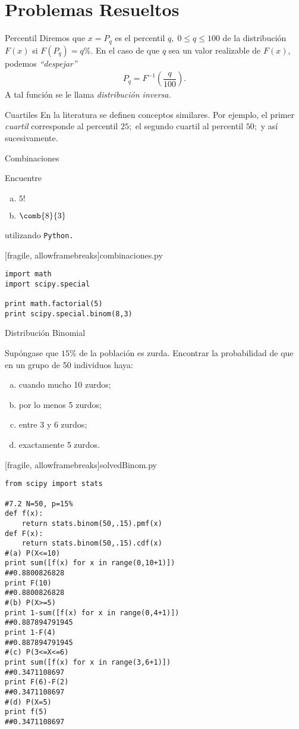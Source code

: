 \section{Problemas Resueltos}
{Percentil}
 Diremos que $x=P_{q}$ es el percentil $q, \; 0\leq q \leq 100$ de la distribución $F(x)$ si $F(P_{q})=q\%.$  En el caso de que $q$ sea un valor realizable de $F(x),$ podemos \emph{``despejar''}
 \begin{align}
  P_{q}=F^{-1}\left( \dfrac{q}{100} \right).
 \end{align}
 A tal función se le llama \emph{distribución inversa.}


{Cuartiles}
 En la literatura se definen conceptos similares. Por ejemplo, el primer \emph{cuartil} corresponde al percentil $25;$ el segundo cuartil al percentil $50;$ y así sucesivamente.

{Combinaciones}
 \begin{exmp}
  \label{sol:7.1}
  Encuentre
  \begin{enumerate}[(a)]
   \item $5!$
   \item $\comb{8}{3}$
  \end{enumerate}
  utilizando \texttt{Python.}
 \end{exmp}


[fragile, allowframebreaks]{combinaciones.py}
 \begin{verbatim}
import math
import scipy.special

print math.factorial(5)
print scipy.special.binom(8,3)
 \end{verbatim}




{Distribución Binomial}
 \begin{exmp}
  \label{sol:7.2}
  Supóngase que $15\%$ de la población es zurda. Encontrar la probabilidad de que en un grupo de 50 individuos haya:
  \begin{enumerate}[(a)]
   \item cuando mucho 10 zurdos; 
   \item por lo menos 5 zurdos; 
   \item entre 3 y 6 zurdos; 
   \item exactamente 5 zurdos.
  \end{enumerate}

 \end{exmp}


[fragile, allowframebreaks]{solvedBinom.py}
 \begin{verbatim}
from scipy import stats

#7.2 N=50, p=15%
def f(x):
    return stats.binom(50,.15).pmf(x)
def F(x):
    return stats.binom(50,.15).cdf(x)
#(a) P(X<=10)
print sum([f(x) for x in range(0,10+1)])
##0.8800826828
print F(10)
##0.8800826828
#(b) P(X>=5)
print 1-sum([f(x) for x in range(0,4+1)])
##0.887894791945
print 1-F(4)
##0.887894791945
#(c) P(3<=X<=6)
print sum([f(x) for x in range(3,6+1)])
##0.3471108697
print F(6)-F(2)
##0.3471108697
#(d) P(X=5)
print f(5)
##0.3471108697
 \end{verbatim}



